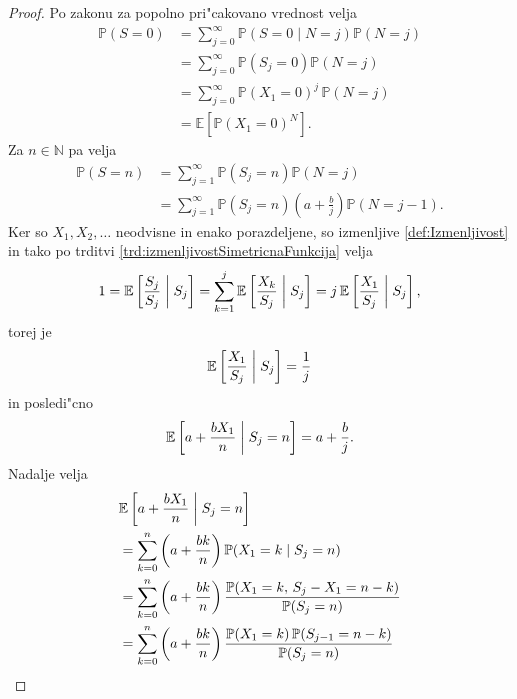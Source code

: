 \documentclass[12pt, a4paper, reqno]{amsart}
\theoremstyle{definition}
\theoremstyle{plain}
\newcommand{\N}{\mathbb{N}}
\newcommand{\E}{\mathbb{E}}
\newcommand{\Prob}{\mathbb{P}}
\newcommand{\1}{\mathds{1}}
\newcommand*{\refPriloga}[1]{%
  \begingroup
    \hypersetup{
      linkcolor=red,
      linkbordercolor=red,
    }%
    \ref{#1}%
  \endgroup
}
\begin{document}
    \begin{proof}
        Po zakonu za popolno pri"cakovano vrednost velja
        \begin{align*}
            \Prob(S = 0) 
                &= \sum_{j = 0}^\infty\Prob(S = 0\mid N = j)\Prob(N = j) \\
                &= \sum_{j = 0}^\infty\Prob(S_j = 0)\Prob(N = j) \\
                &= \sum_{j = 0}^\infty\Prob(X_1 = 0)^j\,\Prob(N = j) \\
                &= \E\left[\Prob(X_1 = 0)^N\right].
        \end{align*}
        Za $n\in\N$ pa velja
        \begin{align}
            \Prob(S = n) 
                &= \sum_{j = 1}^\infty\Prob(S_j = n)\Prob(N = j) \nonumber \\
                &= \sum_{j = 1}^\infty\Prob(S_j = n)\left(a + \frac{b}{j}\right)\Prob(N = j - 1). \label{eq:PanjerRecursionSchemeProof}
        \end{align}
        Ker so $X_1, X_2, \dots$ neodvisne in enako porazdeljene, so izmenljive \refPriloga{def:Izmenljivost} in tako po 
        trditvi \refPriloga{trd:izmenljivostSimetricnaFunkcija} velja
        \begin{equation*}
            1 = \E\left[\frac{S_j}{S_j} \biggm|  S_j\right] = \sum_{k = 1}^j\E\left[\frac{X_k}{S_j} \biggm|  S_j\right] = j\,\E\left[\frac{X_1}{S_j} \biggm|  S_j\right],
        \end{equation*}
        torej je 
        \begin{equation*}
            \E\left[\frac{X_1}{S_j}  \biggm|  S_j\right] = \frac{1}{j}
        \end{equation*}
        in posledi"cno 
        \begin{equation}
            \E\left[a + \frac{bX_1}{n} \biggm|   S_j = n\right] = a + \frac{b}{j}.
            \label{eq:PanjerRecursionSchemeProof2}
        \end{equation}         
        Nadalje velja  
        \begin{align}   
            & \E\left[a + \frac{bX_1}{n} \biggm|   S_j = n\right] \nonumber \\
            &= \sum_{k = 0}^n\left(a + \frac{bk}{n}\right)\Prob(X_1 = k\mid S_j = n) \nonumber \\
            &= \sum_{k = 0}^n\left(a + \frac{bk}{n}\right)\frac{\Prob(X_1 = k,\, S_j - X_1 = n - k)}{\Prob(S_j = n)} \nonumber \\
            &= \sum_{k = 0}^n\left(a + \frac{bk}{n}\right)\frac{\Prob(X_1 = k)\,\Prob(S_{j- 1} = n - k)}{\Prob(S_j = n)} \label{eq:PanjerRecursionSchemeProof3} 
        \end{align}


\end{proof}
\end{document}
